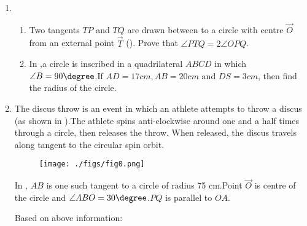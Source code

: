 \begin{enumerate}
\item
  \begin{enumerate}
	  \item Two tangents $TP$ and $TQ$ are drawn between to a circle with centre $\vec{O}$ from an external point $\vec{T}$ (). Prove that $\angle PTQ = 2 \angle OPQ$.
\begin{figure}[h]
	        \centering
	        
		\caption{}
		\label{fig.circle5}
        \end{figure}





\item In ,a circle is inscribed in a quadrilateral $ABCD$ in which $\angle B =90\degree$.If $AD=17cm,AB=20cm$ and $DS=3cm$, then find the radius of the circle.

\begin{figure}[h]
	        \centering
	        
		\caption{}
		\label{fig.circle6}
\end{figure}
   \end{enumerate}






\item The discus throw is an event in which an athlete attempts to throw a discus (as shown in ).The athlete spins anti-clockwise around one and a half times through a circle, then releases the throw. When released, the discus travels along tangent to the circular spin orbit.


\begin{figure}[H]	
	        \centering
		\texttt{[image: ./figs/fig0.png]}
		\caption{}
		\label{fig.circle0}
\end{figure}



In , $AB$ is one such tangent to a circle of radius 75 cm.Point $\vec{ O}$ is centre of the circle and $\angle ABO= 30\degree$.$PQ$ is parallel to $OA$.



\begin{figure}[H]
	        \centering
	        
		\caption{}
		\label{fig.circle7}
        \end{figure}



Based on above information:


\end{enumerate}
